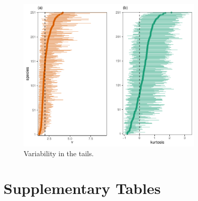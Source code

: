 \documentclass[11pt, a4paper]{article}
\begin{document}
\begin{figure}[h]
  \centering
    \vspace{0.5cm}
    \includegraphics[width=0.8\textwidth]{figures/nu-kurtosis}
    	  \vspace{0.3cm}
	   \caption{Variability in the tails.}
      \label{sfig:nu-kurtosis}
\end{figure}

\clearpage

\section*{Supplementary Tables}
\end{document}

